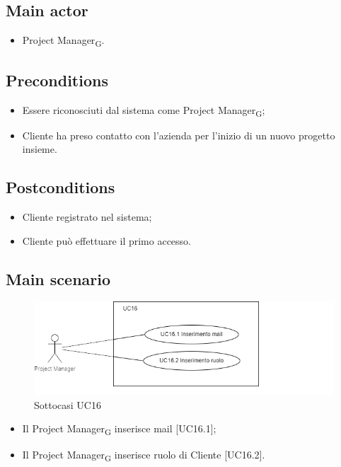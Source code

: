 \documentclass{article}
\begin{document}
    \subsection*{Main actor}
        \begin{itemize}
            \item Project Manager\textsubscript{G}.
        \end{itemize}
        
    \subsection*{Preconditions}
        \begin{itemize}
            \item Essere riconosciuti dal sistema come Project Manager\textsubscript{G};
            \item Cliente ha preso contatto con l'azienda per l'inizio di un nuovo progetto insieme.
        \end{itemize}
        
    \subsection*{Postconditions}
        \begin{itemize}
            \item Cliente registrato nel sistema;
            \item Cliente può effettuare il primo accesso.
        \end{itemize}
    
    \subsection*{Main scenario}
        \begin{figure}[h]
          \centering
          \includegraphics{./imgUML/UC16-zoom.png}
          \caption{Sottocasi UC16}
          \label{fig:UC16_sottocasi}
        \end{figure}
        
        \begin{itemize}
            \item Il Project Manager\textsubscript{G} inserisce mail [UC16.1];
            \item Il Project Manager\textsubscript{G} inserisce ruolo di Cliente [UC16.2].
        \end{itemize}
        
\end{document}
